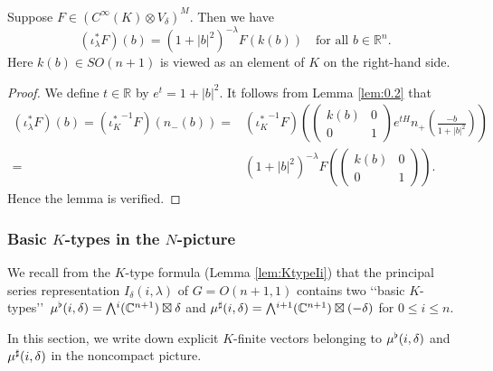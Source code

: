 \begin{lemma}
\label{lem:fKN}
Suppose $F \in (C^{\infty}(K) \otimes V_{\delta})^M$.  
Then we have 
\begin{equation}
\label{eqn:fKN}
(\iota_{\lambda}^{\ast} F)(b)
=
(1+|b|^2)^{-\lambda}F(k(b))
\quad
\text{for all $b \in {\mathbb{R}}^n$}.  
\end{equation}
Here $k(b) \in SO(n+1)$ is viewed as an element of $K$
 on the right-hand side.  
\end{lemma}
\begin{proof}
We define $t \in {\mathbb{R}}$
 by $e^t=1+|b|^2$.  
It follows from Lemma \ref{lem:0.2}
 that 
\begin{align*}
(\iota_{\lambda}^{\ast} F)(b)=({\iota_K^{\ast}}^{-1} F)(n_-(b))
=&({\iota_K^{\ast}}^{-1} F)
\left(
\begin{pmatrix}
k(b) & 0
\\
0& 1
\end{pmatrix}
e^{t H}
n_+(\frac{-b}{1+|b|^2})
\right)
\\
=&
(1+|b|^2)^{-\lambda}
F\left(
\begin{pmatrix}
k(b) & 0
\\
0& 1
\end{pmatrix}
\right). 
\end{align*}
Hence the lemma is verified.  
\end{proof}



\subsubsection{Basic $K$-types in the $N$-picture}
\label{subsec:minKtype}
We recall from the $K$-type formula
 (Lemma \ref{lem:KtypeIi})
 that the principal series representation
$
I_{\delta}(i,\lambda)
$
 of $G=O(n+1,1)$ contains two 
\lq\lq{basic $K$-types}\rq\rq\
 $\mub(i, \delta)=\Exterior^i({\mathbb{C}}^{n+1}) \boxtimes \delta$
 and $\mus(i,\delta)=\Exterior^{i+1}({\mathbb{C}}^{n+1}) \boxtimes (-\delta)$
 for $0 \le i \le n$.  


In this section,
 we write down explicit $K$-finite vectors
 belonging to $\mu^{\flat}(i,\delta)$ and $\mu^{\sharp}(i,\delta)$
 in the noncompact picture.  



